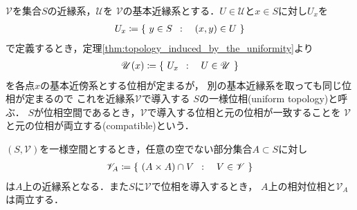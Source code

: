 	\begin{screen}
		\begin{dfn}[一様位相]
			$\mathscr{V}$を集合$S$の近縁系，$\mathscr{U}$を
			$\mathscr{V}$の基本近縁系とする．$U \in \mathscr{U}$と$x \in S$に対し$U_x$を
			\begin{align}
				U_x \coloneqq \left\{\ y \in S\ \, : \quad (x,y) \in U\ \right\}
			\end{align}
			で定義するとき，定理\ref{thm:topology_induced_by_the_uniformity}より
			\begin{align}
				\mathscr{U}(x) \coloneqq \left\{\ U_x\ \, : \quad U \in \mathscr{U}\ \right\}
			\end{align}
			を各点$x$の基本近傍系とする位相が定まるが，
			別の基本近縁系を取っても同じ位相が定まるので
			これを近縁系$\mathscr{V}$で導入する
			$S$の一様位相(uniform topology)と呼ぶ．
			$S$が位相空間であるとき，$\mathscr{V}$で導入する位相と元の位相が一致することを
			$\mathscr{V}$と元の位相が両立する(compatible)という．
		\end{dfn}
	\end{screen}
	
	\begin{screen}
		\begin{thm}[部分一様空間]
			$(S,\mathscr{V})$を一様空間とするとき，任意の空でない部分集合$A \subset S$に対し
			\begin{align}
				\mathscr{V}_A \coloneqq 
				\left\{\ (A \times A) \cap V\ \, : \quad V \in \mathscr{V}\ \right\}
			\end{align}
			は$A$上の近縁系となる．また$S$に$\mathscr{V}$で位相を導入するとき，
			$A$上の相対位相と$\mathscr{V}_A$は両立する．
		\end{thm}
	\end{screen}
	
